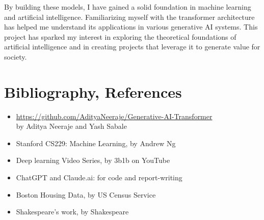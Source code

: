 \documentclass[12pt,a4paper]{article}
\begin{document}
By building these models, I have gained a solid foundation in machine learning and artificial intelligence. Familiarizing myself with the transformer architecture has helped me understand its applications in various generative AI systems.  This project has sparked my interest in exploring the theoretical foundations of artificial intelligence and in creating projects that leverage it to generate value for society.

\section{Bibliography, References}
\begin{itemize}
\item \url{https://github.com/AdityaNeeraje/Generative-AI-Transformer}  \\ by Aditya Neeraje and Yash Sabale
\item Stanford CS229: Machine Learning, by Andrew Ng
\item Deep learning Video Series, by 3b1b on YouTube
\item ChatGPT and Claude.ai: for code and report-writing
\item Boston Housing Data, by US Census Service
\item Shakespeare's work, by Shakespeare
\end{itemize}
\end{document}
